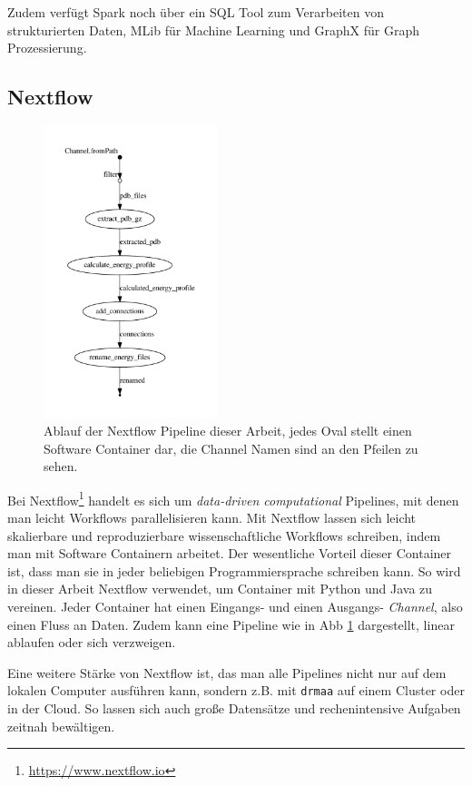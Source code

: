 Zudem verfügt Spark noch über ein SQL Tool zum Verarbeiten von strukturierten Daten, MLib für Machine Learning und GraphX für Graph Prozessierung.



\subsection{Nextflow}

\begin{figure}
    \centering
    \includegraphics[width=0.45\textwidth]{images/flowchart.pdf}
    \caption{Ablauf der Nextflow Pipeline dieser Arbeit, jedes Oval stellt einen Software Container dar, die Channel Namen sind an den Pfeilen zu sehen.}
    \label{fig:nextflow_pipe}
\end{figure}
Bei Nextflow\footnote{\url{https://www.nextflow.io}} handelt es sich um \emph{data-driven computational} Pipelines, mit denen man leicht Workflows parallelisieren kann. Mit Nextflow lassen sich leicht skalierbare und reproduzierbare wissenschaftliche Workflows schreiben, indem man mit Software Containern arbeitet. Der wesentliche Vorteil dieser Container ist, dass man sie in jeder beliebigen Programmiersprache schreiben kann. So wird in dieser Arbeit Nextflow verwendet, um Container mit Python und Java zu vereinen. Jeder Container hat einen Eingangs- und einen Ausgangs- \emph{Channel}, also einen Fluss an Daten. Zudem kann eine Pipeline wie in \ac{Abb} \ref{fig:nextflow_pipe} dargestellt, linear ablaufen oder sich verzweigen.

Eine weitere Stärke von Nextflow ist, das man alle Pipelines nicht nur auf dem lokalen Computer ausführen kann, sondern z.B. mit \texttt{drmaa} auf einem Cluster oder in der Cloud. So lassen sich auch große Datensätze und rechenintensive Aufgaben zeitnah bewältigen.


